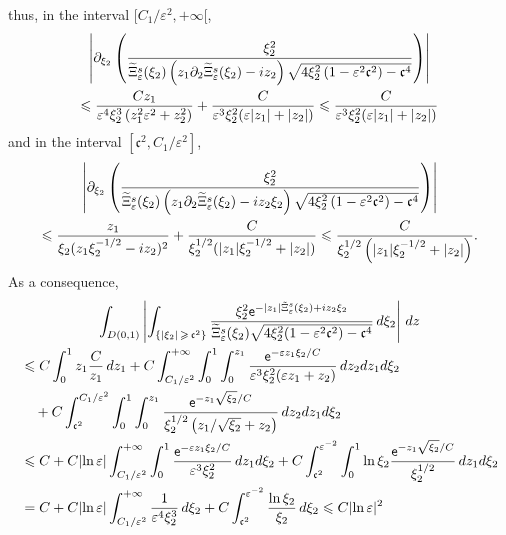 \documentclass[AHL,Unicode,longabstracts,published]{cedram}
\newcommand*\p{\partial}
\newcommand*\ex{{\sf e}}
\newcommand*\cs{{\mathfrak c}}
\newcommand*\ii{\infty}
\newcommand*\gs{\geqslant }
\newcommand*\ls{\leqslant }
\newcommand*\e{\varepsilon}
\renewcommand*\t{\tilde}
\let\oldtilde\tilde
\renewcommand*{\tilde}[1]{\mathchoice{\widetilde{#1}}{\widetilde{#1}}{\oldtilde{#1}}{\oldtilde{#1}}}
\begin{document}
thus, in the interval $ [C_1 / \e^{2}, +\ii [$,
\begin{multline*}
 \left\lvert \p_{\xi_2} \left(\frac{ \xi_2^2 }{ \t\Xi_\e^s (\xi_2) \left(z_1 \p_2 \t\Xi_\e^s (\xi_2) - i z_2\right) \sqrt{ 4 \xi_2^2 \left(1 - \e^2 \cs^2\right) - \cs^4 } } \right)
\right\rvert
\\
\ls \frac{ C z_1 }{ \e^4 \xi_2^3 \left(z_1^2 \e^2 + z_2^2\right) } + \frac{ C }{ \e^3 \xi_2^2 (\e | z_1 | + |z_2 |) }
\ls \frac{ C }{ \e^3 \xi_2^2 (\e | z_1 | + |z_2 |) }
\end{multline*}
and in the interval $ [\cs^2, C_1 / \e^{2}] $,
\begin{multline*}
\left\lvert \p_{\xi_2} \left(\frac{ \xi_2^2 }{ \t\Xi_\e^s (\xi_2) \left(z_1 \p_2 \t\Xi_\e^s (\xi_2) - i z_2 \xi_2\right) \sqrt{ 4 \xi_2^2 \left(1 - \e^2 \cs^2\right) - \cs^4 } } \right)
\right\rvert
\\
\ls \frac{ z_1 }{ \xi_2 (z_1 \xi_2^{-1/2} - i z_2)^2 } + \frac{ C }{ \xi_2^{1/2} (| z_1 | \xi_2^{-1/2} + | z_2 |) }
\ls \frac{ C }{ \xi_2^{1/2} \left(| z_1 | \xi_2^{-1/2} + | z_2 |\right)}.
\end{multline*}
As a consequence,
\begin{multline*}
\int_{D(0,1)} \left\lvert \int_{\left\{ |\xi_2 |\,\gs\,\cs^{2} \right\} } \frac{ \xi_2^2 \ex^{- |z_1| \t\Xi_\e^s (\xi_2) + i z_2 \xi_2} }{
\t\Xi_\e^s (\xi_2) \sqrt{ 4 \xi_2^2 (1 - \e^2 \cs^2) - \cs^4 } } \, d\xi_2 \right\rvert \, dz
\\
\begin{aligned}
& \ls C \int_0^{1} z_1 \frac{C }{z_1} \, dz_1 + C \int_{ C_1 /\e^{2} }^{+\ii} \int_0^1 \int_0^{z_1} \frac{ \ex^{- \e z_1 \xi_2 / C} }{ \e^3 \xi_2^2 (\e z_1 + z_2) }\, dz_2 dz_1 d \xi_2
\\ &\quad + C \int_{\cs^2}^{ C_1 / \e^{2} } \int_0^1 \int_0^{z_1} \frac{ \ex^{- z_1 \sqrt{\xi_2} / C } }{ \xi_2^{1/2} \left(z_1 / \sqrt{\xi_2} + z_2\right) }\, dz_2 dz_1 d \xi_2
\\ &
\ls C + C \lvert \ln \e \rvert \int_{ C_1 /\e^{2} }^{+\ii} \int_0^1 \frac{ \ex^{- \e z_1 \xi_2 / C} }{ \e^3 \xi_2^2 }\, dz_1 d \xi_2 + C \int_{\cs^2}^{ \e^{-2} } \int_0^1 \ln \xi_2 \frac{ \ex^{- z_1 \sqrt{\xi_2} / C } }{ \xi_2^{1/2} } \, dz_1 d\xi_2
\\
& = C + C \lvert \ln \e \rvert \int_{ C_1 / \e^{2} }^{+\ii} \frac{ 1}{ \e^4 \xi_2^3 }\, d \xi_2 + C \int_{\cs^2}^{ \e^{-2} } \frac{ \ln \xi_2 }{ \xi_2 } \, d\xi_2
\ls C \lvert \ln \e \rvert^2
\end{aligned}
\end{multline*}
\end{document}
